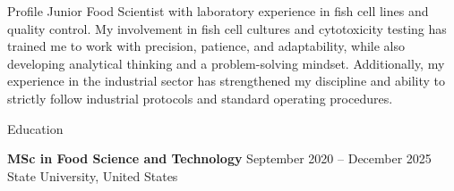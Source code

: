 \documentclass{resume} %
\begin{document}
\begin{rSection}{Profile}
Junior Food Scientist with laboratory experience in fish cell lines and quality control.
My involvement in fish cell cultures and cytotoxicity testing has trained me to work with
precision, patience, and adaptability, while also developing analytical thinking and a
problem-solving mindset. Additionally, my experience in the industrial sector has
strengthened my discipline and ability to strictly follow industrial protocols and standard
operating procedures.
\end{rSection}

\begin{rSection}{Education}

{\bf MSc in Food Science and Technology} \hfill {September 2020 -- December 2025}\\
State University, United States

\medskip
\end{rSection}
\end{document}

